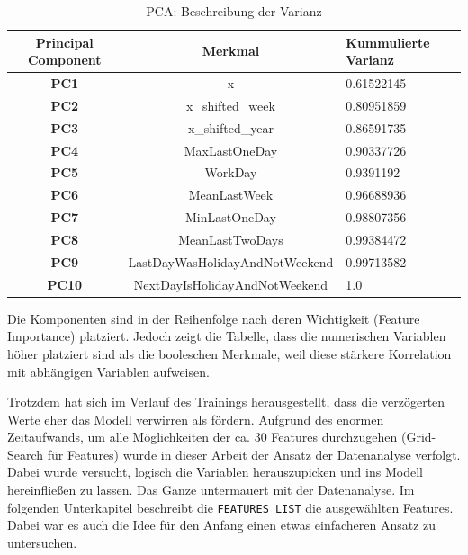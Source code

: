 \documentclass[11pt,ngerman,a4paper,]{article}
\begin{document}
\begin{table}[h!]
\centering
\begin{tabularx}{\textwidth}{|c|c|X|}
\hline
\textbf{Principal Component} & \textbf{Merkmal}                        & \textbf{Kummulierte Varianz} \\ \hline
\textbf{PC1}                 & x                                      & 0.61522145                              \\ \hline
\textbf{PC2}                 & x\_shifted\_week                       & 0.80951859                              \\ \hline
\textbf{PC3}                 & x\_shifted\_year                       & 0.86591735                              \\ \hline
\textbf{PC4}                 & MaxLastOneDay                          & 0.90337726                              \\ \hline
\textbf{PC5}                 & WorkDay                                & 0.9391192                               \\ \hline
\textbf{PC6}                 & MeanLastWeek                           & 0.96688936                              \\ \hline
\textbf{PC7}                 & MinLastOneDay                          & 0.98807356                              \\ \hline
\textbf{PC8}                 & MeanLastTwoDays                        & 0.99384472                              \\ \hline
\textbf{PC9}                 & LastDayWasHolidayAndNotWeekend         & 0.99713582                              \\ \hline
\textbf{PC10}                & NextDayIsHolidayAndNotWeekend          & 1.0                                     \\ \hline
\end{tabularx}
\caption{PCA: Beschreibung der Varianz}
\label{table:pc_explained_variance}
\end{table}

Die Komponenten sind in der Reihenfolge nach deren Wichtigkeit (Feature Importance) platziert. Jedoch zeigt die Tabelle, dass die numerischen Variablen höher platziert sind als die booleschen Merkmale, weil diese stärkere Korrelation mit abhängigen Variablen aufweisen.

Trotzdem hat sich im Verlauf des Trainings herausgestellt, dass die verzögerten Werte eher das Modell verwirren als fördern. Aufgrund des enormen Zeitaufwands, um alle Möglichkeiten der ca. 30 Features durchzugehen (Grid-Search für Features) wurde in dieser Arbeit
der Ansatz der Datenanalyse verfolgt. Dabei wurde versucht, logisch die Variablen herauszupicken und ins Modell hereinfließen zu lassen. Das Ganze untermauert mit der Datenanalyse. Im folgenden Unterkapitel beschreibt die \texttt{FEATURES\_LIST} die ausgewählten Features. Dabei war es auch die Idee für den Anfang einen etwas einfacheren Ansatz zu untersuchen.
\end{document}
